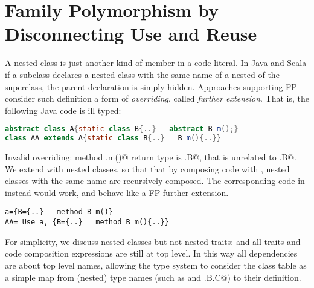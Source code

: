 \section{Family
Polymorphism by Disconnecting Use and Reuse}

A nested class is just another kind of member in a code literal.
In Java and Scala if a subclass declares a nested class with the same
name of a nested of the superclass, the parent declaration is simply hidden.
Approaches supporting FP~\cite{igarashi2005lightweight,IgarashiEtAl08,nystrom2006j,Ernst06,BruceEtAl98,IgarashiViroli07,deep}
consider such definition a form of \emph{overriding},
called \emph{further extension}.
That is, the following Java code is ill typed:
\saveSpace\saveSpace\begin{lstlisting}[language=Java]
abstract class A{static class B{..}   abstract B m();}
class AA extends A{static class B{..}   B m(){..}}
\end{lstlisting}\saveSpace\saveSpace
Invalid overriding: method \Q@AA.m()@ return type is \Q@AA.B@, that is unrelated to \Q@A.B@.
We extend \name with nested classes, so that that
by composing code with \use,
nested classes with the same name are recursively composed.
The corresponding code in \name instead would work, and behave like a FP further extension.
\saveSpace\saveSpace\begin{lstlisting}
a={B={..}   method B m()}
AA= Use a, {B={..}   method B m(){..}}
\end{lstlisting}\saveSpace\saveSpace

For simplicity, we discuss nested classes but not nested traits:
and all traits and code composition expressions are still at top level.
In this way all dependencies are about top level names, allowing the type system 
to consider the class table as a simple map from (nested) type names
(such as \Q@A@ and \Q@A.B.C@)
to their definition.



